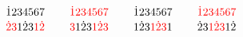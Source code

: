\[ \SeqCompare{\dot{1}234567}{\textcolor{red}{\dot{2}}\textcolor{red}{3}1\dot{2}3\textcolor{red}{1}\textcolor{red}{\dot{2}}}
\qquad
\SeqCompare{\textcolor{red}{\dot{1}}\textcolor{red}{2}\textcolor{red}{3}\textcolor{red}{4}\textcolor{red}{5}\textcolor{red}{6}\textcolor{red}{7}}{\textcolor{red}{3}1\dot{2}3\textcolor{red}{1}\textcolor{red}{\dot{2}}\textcolor{red}{3}}
\qquad
\SeqCompare{\dot{1}234567}{1\dot{2}3\textcolor{red}{1}\textcolor{red}{\dot{2}}\textcolor{red}{3}1}
\qquad
\SeqCompare{\textcolor{red}{\dot{1}}\textcolor{red}{2}\textcolor{red}{3}\textcolor{red}{4}\textcolor{red}{5}\textcolor{red}{6}\textcolor{red}{7}}{\dot{2}3\textcolor{red}{1}\textcolor{red}{\dot{2}}\textcolor{red}{3}1\dot{2}} \]